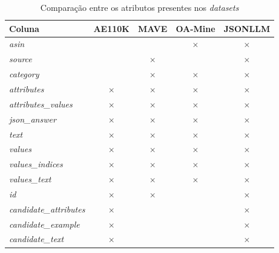 \begin{table}[htbp]\centering
  \caption{Comparação entre os atributos presentes nos \textit{datasets}} \label{tab:dataset_comparison}
  \begin{tabular}{lcccc}
    \toprule
    \textbf{Coluna}                & \textbf{AE110K} & \textbf{MAVE} & \textbf{OA-Mine} & \textbf{JSONLLM} \\
    \midrule
    \textit{asin}                  &                 &               & $\times$         & $\times$         \\
    \textit{source}                &                 & $\times$      &                  & $\times$         \\
    \textit{category}              &                 & $\times$      & $\times$         & $\times$         \\
    \textit{attributes}            & $\times$        & $\times$      & $\times$         & $\times$         \\
    \textit{attributes\_values}    & $\times$        & $\times$      & $\times$         & $\times$         \\
    \textit{json\_answer}          & $\times$        & $\times$      & $\times$         & $\times$         \\
    \textit{text}                  & $\times$        & $\times$      & $\times$         & $\times$         \\
    \textit{values}                & $\times$        & $\times$      & $\times$         & $\times$         \\
    \textit{values\_indices}       & $\times$        & $\times$      & $\times$         & $\times$         \\
    \textit{values\_text}          & $\times$        & $\times$      & $\times$         & $\times$         \\
    \textit{id}                    & $\times$        & $\times$      &                  & $\times$         \\
    \textit{candidate\_attributes} & $\times$        &               &                  & $\times$         \\
    \textit{candidate\_example}    & $\times$        &               &                  & $\times$         \\
    \textit{candidate\_text}       & $\times$        &               &                  & $\times$         \\
    \bottomrule
  \end{tabular}
\end{table}

